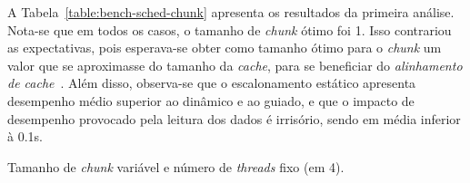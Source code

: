 \documentclass[12pt,a4paper]{article}
\begin{document}
%
%

A Tabela~\ref{table:bench-sched-chunk} apresenta os resultados da primeira
análise. Nota-se que em todos os casos, o tamanho de \textit{chunk} ótimo foi
1.  Isso contrariou as expectativas, pois esperava-se obter como tamanho ótimo
para o \textit{chunk} um valor que se aproximasse do tamanho da \textit{cache},
para se beneficiar do \emph{alinhamento de cache}~\cite{class-notes}. Além
disso, observa-se que o escalonamento estático apresenta desempenho médio
superior ao dinâmico e ao guiado, e que o impacto de desempenho provocado pela
leitura dos dados é irrisório, sendo em média inferior à 0.1s.

\begin{table}[h!]
\footnotesize
\centering
\caption{Tamanho de \textit{chunk} variável e número de \textit{threads} fixo (em 4).}
\label{table:bench-sched-chunk}

\end{table}
\end{document}
